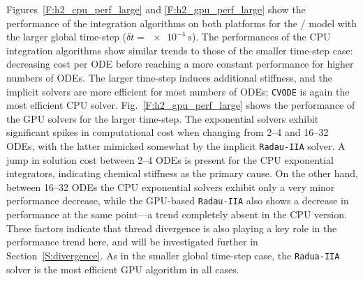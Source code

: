 \documentclass[preprint]{elsarticle}
\begin{document}
Figures~\ref{F:h2_cpu_perf_large} and \ref{F:h2_gpu_perf_large} show the performance of the integration algorithms on both platforms for the \slash{} model with the larger global time-step ($\delta t=\SI{e-4}{\second}$).
The performances of the CPU integration algorithms show similar trends to those of the smaller time-step case: decreasing cost per ODE before reaching a more constant performance for higher numbers of ODEs.
The larger time-step induces additional stiffness, and the implicit solvers are more efficient for most numbers of ODEs; \texttt{CVODE} is again the most efficient CPU solver.
Fig.~\ref{F:h2_gpu_perf_large} shows the performance of the GPU solvers for the larger time-step.
The exponential solvers exhibit significant spikes in computational cost when changing from 2--4 and 16--32 ODEs, with the latter mimicked somewhat by the implicit \texttt{Radau-IIA} solver.
A jump in solution cost between 2--4 ODEs is present for the CPU exponential integrators, indicating chemical stiffness as the primary cause.
On the other hand, between 16--32 ODEs the CPU exponential solvers exhibit only a very minor performance decrease, while the GPU-based \texttt{Radau-IIA} also shows a decrease in performance at the same point---a trend completely absent in the CPU version.
These factors indicate that thread divergence is also playing a key role in the performance trend here, and will be investigated further in Section~\ref{S:divergence}.
As in the smaller global time-step case, the \texttt{Radua-IIA} solver is the most efficient GPU algorithm in all cases.
\end{document}
